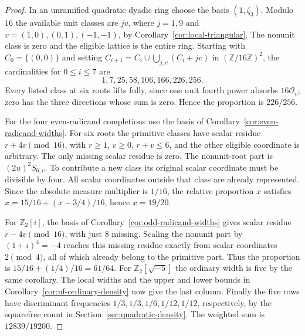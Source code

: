 \documentclass[11pt,letterpaper]{article}
\theoremstyle{definition}
\numberwithin{equation}{section}
\begin{document}
\begin{proof}
In an unramified quadratic dyadic ring choose the basis
$(1,\zeta_3)$. Modulo $16$ the available unit classes are $jv$,
where $j=1,9$ and $v=(1,0),(0,1),(-1,-1)$, by
Corollary~\ref{cor:local-triangular}. The nonunit class is zero
and the eligible lattice is the entire ring. Starting with
$C_0=\{(0,0)\}$ and setting
$C_{i+1}=C_i\cup\bigcup_{j,v}(C_i+jv)$ in
$(\mathbb Z/16\mathbb Z)^2$, the cardinalities for $0\le i\le7$
are
\[
                    1,7,25,58,106,166,226,256.
\]
Every listed class at six roots lifts fully, since one unit
fourth power absorbs $16\mathcal O_v$; zero has the three directions
whose sum is zero. Hence the proportion is $226/256$.

For the four even-radicand completions use the basis of
Corollary~\ref{cor:even-radicand-widths}. For six roots the
primitive classes have scalar residue $r+4v\pmod{16}$, with
$r\ge1$, $v\ge0$, $r+v\le6$, and the other eligible coordinate
is arbitrary. The only missing scalar residue is zero.
The nonunit-root part is $(2u)^2S_{6,v}$. To contribute a new
class its original scalar coordinate must be divisible by four.
All scalar coordinates outside that class are already represented.
Since the absolute measure multiplier is $1/16$, the relative
proportion $x$ satisfies $x=15/16+(x-3/4)/16$, hence $x=19/20$.

For $\mathbb Z_2[i]$, the basis of
Corollary~\ref{cor:odd-radicand-widths} gives scalar residue
$r-4v\pmod{16}$, with just $8$ missing. Scaling the nonunit part
by $(1+i)^4=-4$ reaches this missing residue exactly from scalar
coordinates $2\pmod4$, all of which already belong to the
primitive part. Thus the proportion is $15/16+(1/4)/16=61/64$.
For $\mathbb Z_2[\sqrt{-5}]$ the ordinary width is five by the
same corollary. The local widths and the upper and lower bounds
in Corollary~\ref{cor:nf-ordinary-density} now give the last
column. Finally the five rows have discriminant frequencies
$1/3,1/3,1/6,1/12,1/12$, respectively, by the squarefree count
in Section~\ref{sec:quadratic-density}. The weighted sum is
$12839/19200$.
\end{proof}
\end{document}
